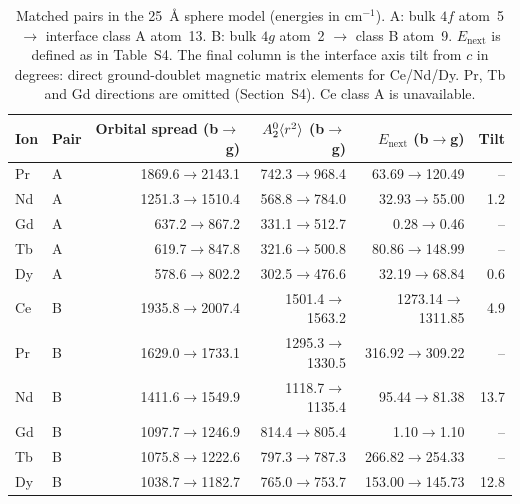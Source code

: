 \begin{table}[H]
\centering
\footnotesize
\setlength{\tabcolsep}{4pt}
\caption{Matched pairs in the 25~\AA{} sphere model (energies in cm$^{-1}$). A: bulk $4f$ atom~5 $\to$ interface class A atom~13. B: bulk $4g$ atom~2 $\to$ class B atom~9. $E_{\mathrm{next}}$ is defined as in Table~S4. The final column is the interface axis tilt from $c$ in degrees: direct ground-doublet magnetic matrix elements for Ce/Nd/Dy. Pr, Tb and Gd directions are omitted (Section~S4). Ce class A is unavailable.}\label{tab:S7}
\begin{tabular}{llrrrr}
\toprule
Ion & Pair & Orbital spread (b$\to$g) & $A_2^0\langle r^2\rangle$ (b$\to$g) & $E_{\mathrm{next}}$ (b$\to$g) & Tilt \\
\midrule
Pr & A & 1869.6$\to$2143.1 & 742.3$\to$968.4 & 63.69$\to$120.49 & -- \\
Nd & A & 1251.3$\to$1510.4 & 568.8$\to$784.0 & 32.93$\to$55.00 & 1.2 \\
Gd & A & 637.2$\to$867.2 & 331.1$\to$512.7 & 0.28$\to$0.46 & -- \\
Tb & A & 619.7$\to$847.8 & 321.6$\to$500.8 & 80.86$\to$148.99 & -- \\
Dy & A & 578.6$\to$802.2 & 302.5$\to$476.6 & 32.19$\to$68.84 & 0.6 \\
Ce & B & 1935.8$\to$2007.4 & 1501.4$\to$1563.2 & 1273.14$\to$1311.85 & 4.9 \\
Pr & B & 1629.0$\to$1733.1 & 1295.3$\to$1330.5 & 316.92$\to$309.22 & -- \\
Nd & B & 1411.6$\to$1549.9 & 1118.7$\to$1135.4 & 95.44$\to$81.38 & 13.7 \\
Gd & B & 1097.7$\to$1246.9 & 814.4$\to$805.4 & 1.10$\to$1.10 & -- \\
Tb & B & 1075.8$\to$1222.6 & 797.3$\to$787.3 & 266.82$\to$254.33 & -- \\
Dy & B & 1038.7$\to$1182.7 & 765.0$\to$753.7 & 153.00$\to$145.73 & 12.8 \\
\bottomrule
\end{tabular}
\end{table}

